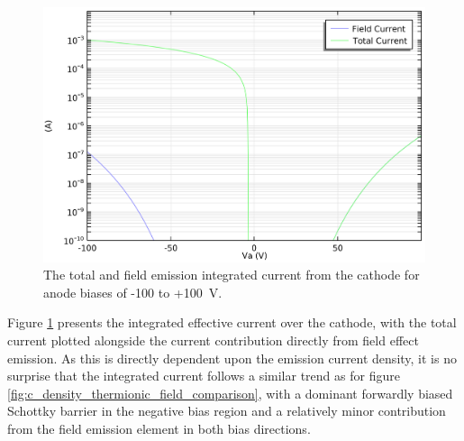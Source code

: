 \begin{refsection}
\begin{figure}[H]
    \centering
    \includegraphics[width=0.8\linewidth]{Chapter7/Figs/Raster/Comsol/current_thermionic_field_comparison.png}
    \caption{The total and field emission integrated current from the cathode for anode biases of -100 to +100~\si{\volt}.}
    \label{fig:c_current_thermionic_field_comparison}
\end{figure}

Figure \ref{fig:c_current_thermionic_field_comparison} presents the integrated effective current over the cathode, with the total current plotted alongside the current contribution directly from field effect emission. As this is directly dependent upon the emission current density, it is no surprise that the integrated current follows a similar trend as for figure \ref{fig:c_density_thermionic_field_comparison}, with a dominant forwardly biased Schottky barrier in the negative bias region and a relatively minor contribution from the field emission element in both bias directions.

\printbibliography[heading=subbibliography]

\end{refsection}